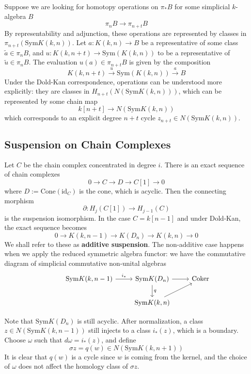 \documentclass{article}
\newcommand{\Sym}{\textrm{Sym}}
\newcommand{\id}{\textrm{id}}
\theoremstyle{definition}
\theoremstyle{definition}
\theoremstyle{definition}
\theoremstyle{definition}
\theoremstyle{definition}
\theoremstyle{definition}
\theoremstyle{definition}
\theoremstyle{definition}
\begin{document}
Suppose we are looking for homotopy operations on $\pi_*B$ for some simplicial $k$-algebra $B$
\[\pi_n B\to \pi_{n+t}B\]
By representability and adjunction, these operations are represented by classes in $\pi_{n+t}(\Sym K(k,n))$. Let $a: K(k,n)\to B$ be a representative of some class $\tilde{a}\in \pi_n B$, and $u: K(k,n+t)\to\Sym(K(k,n))$ to be a representative of $\tilde{u}\in \pi_n B$. The evaluation $u(a)\in \pi_{n+t}B$ is given by the composition
\[K(k,n+t)\xrightarrow{u} \Sym(K(k,n))\xrightarrow{a} B\]
Under the Dold-Kan correspondence, operations can be understood more explicitly: they are classes in $H_{n+t}(N(\Sym K(k,n)))$, which can be represented by some chain map 
\[k[n+t]\to N(\Sym K(k,n))\]
which corresponds to an explicit degree $n+t$ cycle $z_{n+t}\in N(\Sym K(k,n))$. 

\subsection{Suspension on Chain Complexes}

Let $C$ be the chain complex concentrated in degree $i$. There is an exact sequence of chain complexes 
\[0\to C\to D\to C[1]\to 0\]
where $D:= \textrm{Cone}(\id_{C})$ is the cone, which is acyclic. Then the connecting morphism 
\[\partial: H_{j}(C[1])\to H_{j-1}(C) \]
is the suspension isomorphism. In the case $C=k[n-1]$ and under Dold-Kan, the exact sequence becomes
\[0\to K(k,n-1)\to K(D_n)\to K(k,n)\to 0\]
We shall refer to these as \textbf{additive suspension}. The non-additive case happens when we apply the reduced symmetric algebra functor: we have the commutative diagram of simplicial commutative non-unital algebras
\[\begin{tikzcd}
	{} & {\textrm{Sym}K(k,n-1)} & {\textrm{Sym}K(D_n)} & {\textrm{Coker}} \\
	&& {\textrm{Sym}K(k,n)}
	\arrow["{i_*}", from=1-2, to=1-3]
	\arrow[from=1-3, to=1-4]
	\arrow["q", from=1-3, to=2-3]
	\arrow[from=2-3, to=1-4]
\end{tikzcd}\]




Note that $\Sym K(D_n)$ is still acyclic. After normalization, a class $z\in N({\textrm{Sym}K(k,n-1)})$ still injects to a class $i_*(z)$, which is a boundary. Choose $\omega$ such that $d\omega=i_*(z)$, and define 
\[\sigma z=q(w)\in N({\textrm{Sym}K(k,n+1)})\]
It is clear that $q(w)$ is a cycle since $w$ is coming from the kernel, and the choice of $\omega$ does not affect the homology class of $\sigma {z}$. 
\end{document}

